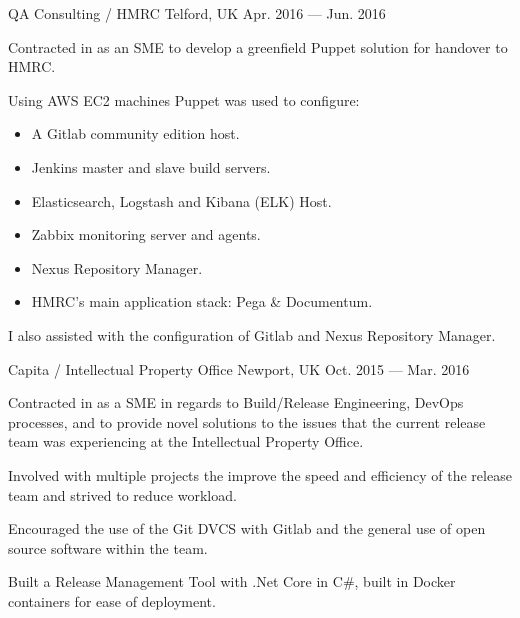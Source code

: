 \begin{cventries}
    {QA Consulting / HMRC} %
    {Telford, UK} %
    {Apr. 2016 — Jun. 2016} %
    {
	    \begin{cvitems} %
	    \item {Contracted in as an SME to develop a greenfield Puppet solution for handover to HMRC.}
	    \item {Using AWS EC2 machines Puppet was used to configure:}
		    \begin{itemize}
			    \item {A Gitlab community edition host.}
			    \item {Jenkins master and slave build servers.}
			    \item {Elasticsearch, Logstash and Kibana (ELK) Host.}
			    \item {Zabbix monitoring server and agents.}
			    \item {Nexus Repository Manager.}
			    \item {HMRC's main application stack: Pega \& Documentum.}
		    \end{itemize}
	    \item {I also assisted with the configuration of Gitlab and Nexus Repository Manager.}
	    \end{cvitems}
    }


	{Capita / Intellectual Property Office} %
    {Newport, UK} %
    {Oct. 2015 — Mar. 2016} %
    {
	    \begin{cvitems} %
	    \item {Contracted in as a SME in regards to Build/Release Engineering, DevOps processes, and to provide novel solutions to the issues that the current release team was experiencing at the Intellectual Property Office.}
	    \item {Involved with multiple projects the improve the speed and efficiency of the release team and strived to reduce workload.}
	    \item {Encouraged the use of the Git DVCS with Gitlab and the general use of open source software within the team.}
	    \item {Built a Release Management Tool with .Net Core in C\#, built in Docker containers for ease of deployment.}
	    \end{cvitems}
    }


\end{cventries}
